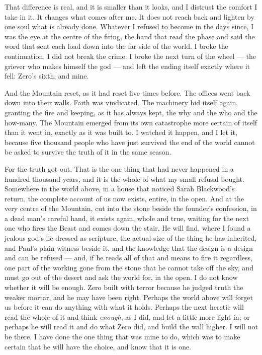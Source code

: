 That difference is real, and it is smaller than it looks, and I distrust the comfort I take in it. It changes what comes after me. It does not reach back and lighten by one soul what is already done. Whatever I refused to become in the days since, I was the eye at the centre of the firing, the hand that read the phase and said the word that sent each load down into the far side of the world. I broke the continuation. I did not break the crime. I broke the next turn of the wheel --- the griever who makes himself the god --- and left the ending itself exactly where it fell: Zero's sixth, and mine.\par

And the Mountain reset, as it had reset five times before. The offices went back down into their walls. Faith was vindicated. The machinery hid itself again, granting the fire and keeping, as it has always kept, the why and the who and the how-many. The Mountain emerged from its own catastrophe more certain of itself than it went in, exactly as it was built to. I watched it happen, and I let it, because five thousand people who have just survived the end of the world cannot be asked to survive the truth of it in the same season.\par

For the truth got out. That is the one thing that had never happened in a hundred thousand years, and it is the whole of what my small refusal bought. Somewhere in the world above, in a house that noticed Sarah Blackwood's return, the complete account of us now exists, entire, in the open. And at the very centre of the Mountain, cut into the stone beside the founder's confession, in a dead man's careful hand, it exists again, whole and true, waiting for the next one who fires the Beast and comes down the stair. He will find, where I found a jealous god's lie dressed as scripture, the actual size of the thing he has inherited, and Paul's plain witness beside it, and the knowledge that the design is a design and can be refused --- and, if he reads all of that and means to fire it regardless, one part of the working gone from the stone that he cannot take off the sky, and must go out of the desert and ask the world for, in the open. I do not know whether it will be enough. Zero built with terror because he judged truth the weaker mortar, and he may have been right. Perhaps the world above will forget us before it can do anything with what it holds. Perhaps the next heretic will read the whole of it and think \emph{enough}, as I did, and let a little more light in; or perhaps he will read it and do what Zero did, and build the wall higher. I will not be there. I have done the one thing that was mine to do, which was to make certain that he will have the choice, and know that it is one.\par

